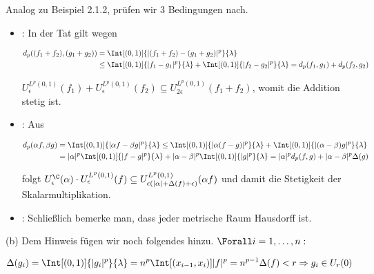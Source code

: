\begin{solution}
\begin{enumerate}[label = (\roman*)]
\end{enumerate}

Analog zu Beispiel 2.1.2, prüfen wir 3 Bedingungen nach.

\begin{itemize}

  \item
  :
  In der Tat gilt wegen

  \begin{align*}
    d_p((f_1 + f_2), (g_1 + g_2))
    & =
    \Int[(0, 1)]{|(f_1 + f_2) - (g_1 + g_2)|^p}{\lambda} \\
    & \leq
    \Int[(0, 1)]{|f_1  - g_1|^p}{\lambda} +
    \Int[(0, 1)]{|f_2  - g_2|^p}{\lambda}
    =
    d_p(f_1, g_1) + d_p(f_2, g_2)
  \end{align*}

  $U_\epsilon^{L^p(0, 1)}(f_1) + U_\epsilon^{L^p(0, 1)}(f_2) \subseteq U_{2 \epsilon}^{L^p(0, 1)}(f_1 + f_2)$, womit die Addition stetig ist.

  \item
  :
  Aus

  \begin{align*}
    d_p(\alpha f, \beta g)
    & =
    \Int[(0, 1)]{|\alpha f - \beta g|^p}{\lambda}
    \leq
    \Int[(0, 1)]{|\alpha (f - g)|^p}{\lambda} +
    \Int[(0, 1)]{|(\alpha - \beta) g|^p}{\lambda} \\
    & =
    |\alpha|^p
    \Int[(0, 1)]{|f - g|^p}{\lambda} +
    |\alpha - \beta|^p
    \Int[(0, 1)]{|g|^p}{\lambda}
    =
    |\alpha|^p
    d_p(f, g) +
    |\alpha - \beta|^p
    \Delta(g)
  \end{align*}

  folgt $U_\epsilon^\C(\alpha) \cdot U_\epsilon^{L^p(0, 1)}(f) \subseteq U_{\epsilon (|\alpha| + \Delta(f) + \epsilon)}^{L^p(0, 1)}(\alpha f)$ und damit die Stetigkeit der Skalarmultiplikation.

  \item
  :
  Schließlich bemerke man, dass jeder metrische Raum Hausdorff ist.

\end{itemize}

(b)
Dem Hinweis fügen wir noch folgendes hinzu. $\Forall i = 1, \ldots, n:$

\begin{align*}
  \Delta(g_i)
  =
  \Int[(0, 1)]{|g_i|^p}{\lambda}
  =
  n^p
  \Int[(x_{i-1}, x_i)]{|f|^p}
  =
  n^{p-1} \Delta(f) < r
  \Rightarrow
  g_i \in U_r(0)
\end{align*}


\end{solution}
